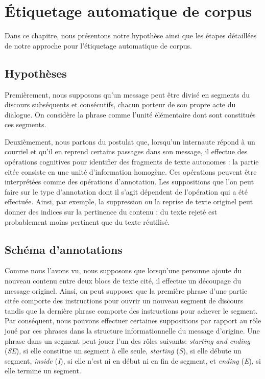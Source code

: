 
\chapter{Étiquetage automatique de corpus}

\label{ch:methodology_for_automatic_corpora_annotation}

Dans ce chapitre, nous présentons notre hypothèse ainsi que les étapes détaillées de notre approche pour l'étiquetage automatique de corpus.

\section{Hypothèses}

Premièrement, nous supposons qu'un message peut être divisé en segments du discours subséquents et consécutifs, chacun porteur de son propre acte du dialogue. On considère la phrase comme l'unité élémentaire dont sont constitués ces segments. 

Deuxièmement, nous partons du postulat que, lorsqu'un internaute répond à un courriel et qu'il en reprend certains passages dans son message, il effectue des opérations cognitives pour identifier des fragments de texte autonomes : la partie citée consiste en une unité d'information homogène. Ces opérations peuvent être interprétées comme des opérations d'annotation. Les suppositions que l'on peut faire sur le type d'annotation dont il s'agit dépendent de l'opération qui a été effectuée. Ainsi, par exemple, la suppression ou la reprise de texte originel peut donner des indices sur la pertinence du contenu : du texte rejeté est probablement moins pertinent que du texte réutilisé.

\section{Schéma d'annotations}

Comme nous l'avons vu, nous supposons que lorsqu'une personne ajoute du nouveau contenu entre deux blocs de texte cité, il effectue un découpage du message originel. Ainsi, on peut supposer que la première phrase d'une partie citée comporte des instructions pour ouvrir un nouveau segment de discours tandis que la dernière phrase comporte des instructions pour achever le segment. Par conséquent, nous pouvons effectuer certaines suppositions par rapport au rôle joué par ces phrases dans la structure informationnelle du message d'origine. Une phrase dans un segment peut jouer l'un des rôles suivants: \emph{starting and ending} (\textit{SE}), si elle constitue un segment à elle seule, \emph{starting} (\textit{S}), si elle débute un segment, \emph{inside} (\textit{I}), si elle n'est ni en début ni en fin de segment, et \emph{ending} (\textit{E}), si elle termine un segment.

